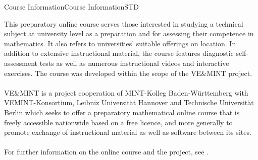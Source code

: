 \begin{MXContent}{Course Information}{Course Information}{STD}

This preparatory online course serves those interested in studying a technical subject at university level as a preparation and for
assessing their competence in mathematics. It also refers to universities' suitable offerings on location.
In addition to extensive instructional material, the course features diagnostic self-assessment tests as well as
numerous instructional videos and interactive exercises.
The course was developed within the scope of the VE\&MINT project.
\ \\ \ \\
VE\&MINT is a project cooperation of MINT-Kolleg Baden-Württemberg
with VEMINT-Konsortium, Leibniz Universität Hannover and Technische Universität Berlin which seeks to
offer a preparatory mathematical online course that is freely accessible nationwide based on a free licence,
and more generally to promote exchange of instructional material as well as software between its sites.
\ \\ \ \\
For further information on the online course and the project, see .
\end{MXContent}

